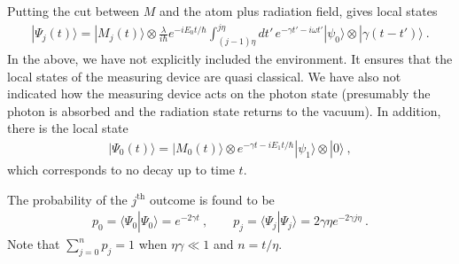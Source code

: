 \documentclass[12pt]{article}
\theoremstyle{plain}
\theoremstyle{definition}
\theoremstyle{remark}
\def\bra#1{\langle #1|}
\def\ket#1{| #1\rangle}
\newcommand{\EQ}[1]{\begin{equation}\begin{split} #1
\end{split}\end{equation}}
\begin{document}
Putting the cut between $M$ and the atom plus radiation field, gives local states
\EQ{
\ket{\Psi_j(t)}=\ket{M_j(t)}\otimes
\frac{\lambda}{i\hbar}e^{-iE_0t/\hbar}\int_{(j-1)\eta}^{j\eta} dt'\,e^{-\gamma t'-i\omega t'}\ket{\psi_0}\otimes\ket{\gamma(t-t')}\ .
}
In the above, we have not explicitly included the environment. It ensures that the local states of the measuring device are quasi classical. We have also not indicated how the measuring device acts on the photon state (presumably the photon is absorbed and the radiation state returns to the vacuum). In addition, there is the local state 
\EQ{
\ket{\Psi_0(t)}=\ket{M_0(t)}\otimes e^{-\gamma t-iE_1t/\hbar}\ket{\psi_1}\otimes\ket{0}\ ,
}
which corresponds to no decay up to time $t$.

The probability of the $j^\text{th}$ outcome is found to be
\EQ{
p_0=\bra{\Psi_0}{\Psi_0}\rangle=e^{-2\gamma t}\ ,\qquad p_j=\bra{\Psi_j}\Psi_j\rangle=2\gamma\eta e^{-2\gamma j\eta}\ .
}
Note that $\sum_{j=0}^{n}p_j=1$ when $\eta\gamma\ll1$ and $n=t/\eta$.
\end{document}
